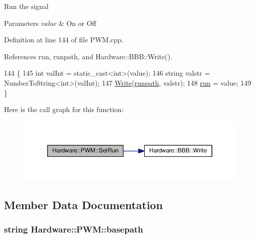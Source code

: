 Run the signal 


\begin{DoxyParams}{Parameters}
{\em value} & On or Off\\
\hline
\end{DoxyParams}


Definition at line 144 of file P\+W\+M.\+cpp.



References run, runpath, and Hardware\+::\+B\+B\+B\+::\+Write().


\begin{DoxyCode}
144                           \{
145   \textcolor{keywordtype}{int} valInt = \textcolor{keyword}{static\_cast<}\textcolor{keywordtype}{int}\textcolor{keyword}{>}(value);
146   \textcolor{keywordtype}{string} valstr = NumberToString<int>(valInt);
147   \hyperlink{class_hardware_1_1_b_b_b_a155cc06f76d82a6b690ce5ea08e7c68e}{Write}(\hyperlink{class_hardware_1_1_p_w_m_ac1eb93467481ee2bd3565f1be47b8a01}{runpath}, valstr);
148   \hyperlink{class_hardware_1_1_p_w_m_a04531646b41accced24d46046c4bc7de}{run} = value;
149 \}
\end{DoxyCode}


Here is the call graph for this function\+:\nopagebreak
\begin{figure}[H]
\begin{center}
\leavevmode
\includegraphics[width=350pt]{class_hardware_1_1_p_w_m_a73b5f0047d4eb62f93f72745124fca73_cgraph}
\end{center}
\end{figure}




\subsection{Member Data Documentation}
\hypertarget{class_hardware_1_1_p_w_m_a344f82a0812dceb40aa48d4789d09c68}{}
\subsubsection[{basepath}]{\setlength{\rightskip}{0pt plus 5cm}string Hardware\+::\+P\+W\+M\+::basepath\hspace{0.3cm}{\ttfamily [private]}}\label{class_hardware_1_1_p_w_m_a344f82a0812dceb40aa48d4789d09c68}


